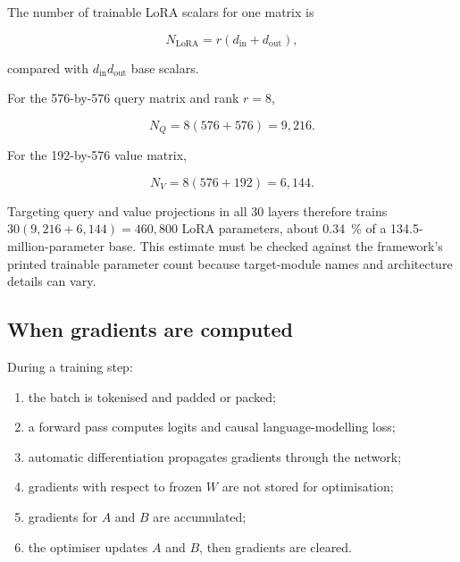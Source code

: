 The number of trainable LoRA scalars for one matrix is

\begin{equation}
    N_{\mathrm{LoRA}} = r(d_{\mathrm{in}}+d_{\mathrm{out}}),
    \label{eq:lora-parameter-count}
\end{equation}

compared with $d_{\mathrm{in}}d_{\mathrm{out}}$ base scalars.

\begin{workedexample}
For the 576-by-576 query matrix and rank $r=8$,

\[
    N_Q = 8(576+576)=9{,}216.
\]

For the 192-by-576 value matrix,

\[
    N_V = 8(576+192)=6{,}144.
\]

Targeting query and value projections in all 30 layers therefore trains
$30(9{,}216+6{,}144)=460{,}800$ LoRA parameters, about \qty{0.34}{\percent} of
a 134.5-million-parameter base.
This estimate must be checked against the framework's printed trainable
parameter count because target-module names and architecture details can vary.
\end{workedexample}

\subsection{When gradients are computed}

During a training step:

\begin{enumerate}
    \item the batch is tokenised and padded or packed;
    \item a forward pass computes logits and causal language-modelling loss;
    \item automatic differentiation propagates gradients through the network;
    \item gradients with respect to frozen $W$ are not stored for optimisation;
    \item gradients for $A$ and $B$ are accumulated;
    \item the optimiser updates $A$ and $B$, then gradients are cleared.
\end{enumerate}

